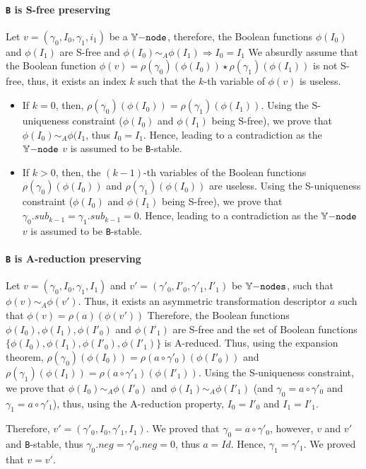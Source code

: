 \documentclass[a4paper,10pt]{article}
\begin{document}
\paragraph{\texttt{B} is S-free preserving\\}
Let $v=(\gamma_0, I_0, \gamma_1, i_1)$ be a $\mathbb{Y}\mathtt{-node}$, therefore, the Boolean functions $\phi(I_0)$ and $\phi(I_1)$ are S-free and $\phi(I_0) \sim_A \phi(I_1) \Rightarrow I_0 = I_1$
We absurdly assume that the Boolean function $\phi(v) = \rho(\gamma_0)(\phi(I_0)) \star \rho(\gamma_1)(\phi(I_1))$ is not S-free, thus, it exists an index $k$ such that the $k$-th variable of $\phi(v)$ is useless.
\begin{itemize}
\item If $k=0$, then, $\rho(\gamma_0)(\phi(I_0)) = \rho(\gamma_1)(\phi(I_1))$.
Using the S-uniqueness constraint ($\phi(I_0)$ and $\phi(I_1)$ being S-free), we prove that $\phi(I_0) \sim_A \phi(I_1$, thus $I_0 = I_1$.
Hence, leading to a contradiction as the $\mathbb{Y}\mathtt{-node}$ $v$ is assumed to be \texttt{B}-stable.
\item If $k>0$, then, the $(k-1)$-th variables of the Boolean functions $\rho(\gamma_0)(\phi(I_0))$ and $\rho(\gamma_1)(\phi(I_0))$ are useless.
Using the S-uniqueness constraint ($\phi(I_0)$ and $\phi(I_1)$ being S-free), we prove that $\gamma_0.sub_{k-1} = \gamma_1.sub_{k-1} = 0$.
Hence, leading to a contradiction as the $\mathbb{Y}\mathtt{-node}$ $v$ is assumed to be \texttt{B}-stable.
\end{itemize}

\paragraph{\texttt{B} is A-reduction preserving\\}
Let $v=(\gamma_0, I_0, \gamma_1, I_1)$ and $v'=(\gamma'_0, I'_0, \gamma'_1, I'_1)$ be $\mathbb{Y}\mathtt{-nodes}$, such that $\phi(v) \sim_A \phi(v')$.
Thus, it exists an asymmetric transformation descriptor $a$ such that $\phi(v) = \rho(a)(\phi(v'))$
Therefore, the Boolean functions $\phi(I_0), \phi(I_1), \phi(I'_0)$ and $\phi(I'_1)$ are S-free and the set of Boolean functions $\{\phi(I_0), \phi(I_1), \phi(I'_0), \phi(I'_1)\}$ is A-reduced.
Thus, using the expansion theorem, $\rho(\gamma_0)(\phi(I_0)) = \rho(a \circ \gamma'_0)(\phi(I'_0))$ and $\rho(\gamma_1)(\phi(I_1)) = \rho(a \circ \gamma'_1)(\phi(I'_1))$.
Using the S-uniqueness constraint, we prove that $\phi(I_0) \sim_A \phi(I'_0)$ and $\phi(I_1) \sim_A \phi(I'_1)$ (and $\gamma_0 = a \circ \gamma'_0$ and $\gamma_1 = a \circ \gamma'_1$), thus, using the A-reduction property, $I_0 = I'_0$ and $I_1 = I'_1$.

Therefore, $v'=(\gamma'_0, I_0, \gamma'_1, I_1)$.
We proved that $\gamma_0 = a \circ \gamma'_0$, however, $v$ and $v'$ and \texttt{B}-stable, thus $\gamma_0.neg = \gamma'_0.neg = 0$, thus $a = Id$.
Hence, $\gamma_1 = \gamma'_1$.
We proved that $v = v'$.
\end{document}
